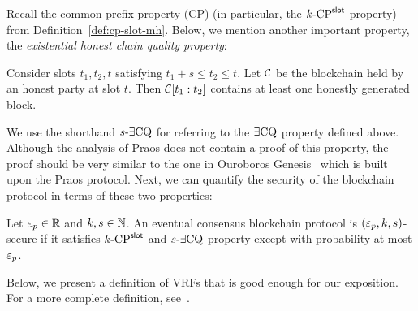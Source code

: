     Recall the common prefix property (CP) (in particular, the ${k}\text{-}\mathrm{CP}^{\mathsf{slot}}$ property) 
    from Definition~\ref{def:cp-slot-mh}. 
    Below, we mention another important property, 
    the \emph{existential honest chain quality property}: 


    \begin{definition}\label{def:ECQ}        
        Consider slots $t_1, t_2, t$ satisfying $t_1 + s \leq t_2 \leq t$. 
        Let $\mathcal{C}$ be the blockchain held by an honest party at slot $t$. 
        Then $\mathcal{C}[t_1:t_2]$ contains at least one 
        honestly generated block.
    \end{definition}
    We use the shorthand ${s}\text{-}\exists\mathrm{CQ}$ for referring to the $\exists\mathrm{CQ}$ property defined above. 
    Although the analysis of Praos does not contain a proof of this property, 
    the proof should be very similar to the one in Ouroboros Genesis~\cite{Genesis} 
    which is built upon the Praos protocol.
    Next, we can quantify the security of the blockchain protocol in terms of these two properties:

    \begin{definition}\label{def:blockchain-security}
        Let $\mathsf{\varepsilon}_p \in \mathbb{R}$ and $k, s \in \mathbb{N}$. 
        An eventual consensus blockchain protocol is $(\mathsf{\varepsilon}_p, k, s)$-secure if 
        it satisfies ${k}\text{-}\mathrm{CP}^{\mathsf{slot}}$ and ${s}\text{-}\exists\mathrm{CQ}$ property 
        except with probability at most $\mathsf{\varepsilon}_p$.
    \end{definition}





Below, we present a definition of VRFs that is good enough for our exposition. 
For a more complete definition, see~\cite{VRFMicali,VRFDodis}.

